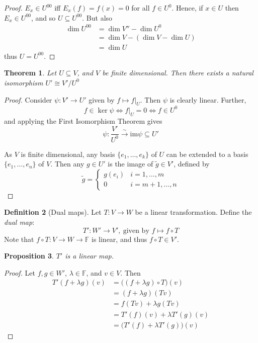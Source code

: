 \documentclass[10pt,fleqn]{article}
\newcommand{\im}{\mathrm{im}}
\newcommand{\field}{\mathbb{F}}
\theoremstyle{definition} \newtheorem{defn}{Definition}[section]
\theoremstyle{plain}      \newtheorem{thm}[defn]{Theorem}
\theoremstyle{plain}      \newtheorem{prop}[defn]{Proposition}
\theoremstyle{plain}      \newtheorem{lem}[defn]{Lemma}
\theoremstyle{plain}      \newtheorem{cor}[defn]{Corollary}
\theoremstyle{plain}      \newtheorem{ad}[defn]{Addendum}
\theoremstyle{definition} \newtheorem{ex}[defn]{Example}
\theoremstyle{definition} \newtheorem{rem}[defn]{Remark}
\numberwithin{equation}{subsection}
\begin{document}
\begin{proof}
    $E_x\in U^{00}$ iff $E_x(f)=f(x)=0$ for all $f\in U^0$.
    Hence, if $x\in U$ then $E_x\in U^{00}$, and so $U\subseteq U^{00}$.
    But also
    \begin{align*}
        \dim U^{00}
        &=
        \dim V''-\dim U^0\\
        &=
        \dim V-(\dim V-\dim U)\\
        &=
        \dim U
    \end{align*}
    thus $U=U^{00}$.
\end{proof}

\begin{thm}
    Let $U\subseteq V$, and $V$ be finite dimensional.
    Then there exists a natural isomorphism $U'\cong V'/U^0$
\end{thm}

\begin{proof}
    Consider $\psi:V'\to U'$ given by $f\mapsto f|_U$.
    Then $\psi$ is clearly linear.
    Further,
    \[
        f\in\ker\psi\iff
        f|_U=0\iff
        f\in U^0
    \]
    and applying the First Isomorphism Theorem gives
    \[
        \psi:\frac{V'}{U^0}\overset{\sim}{\to}\im\psi\subseteq U'
    \]

    As $V$ is finite dimensional, any basis $\{e_1,\ldots,e_k\}$ of $U$ can be extended to a basis $\{e_1,\ldots,e_n\}$ of $V$.
    Then any $g\in U'$ is the image of $\tilde{g}\in V'$, defined by
    \[
        \tilde{g}=
        \left\{
        \begin{array}{lr}
            g(e_i)&i=1,\ldots,m\\
            0&i=m+1,\ldots,n
        \end{array}
        \right.
    \]
\end{proof}

\begin{defn}[Dual maps]
    Let $T:V\to W$ be a linear transformation.
    Define the \emph{dual map}:
    \[
        T':W'\to V',~\text{given by }f\mapsto f\circ T
    \]
    Note that $f\circ T:V\to W\to\field$ is linear, and thus $f\circ T\in V'$.
\end{defn}

\begin{prop}
    $T'$ is a linear map.
\end{prop}

\begin{proof}
    Let $f,g\in W'$, $\lambda\in\field$, and $v\in V$.
    Then
    \begin{align*}
        T'(f+\lambda g)(v)
        &=
        \big((f+\lambda g)\circ T\big)(v)\\
        &=
        (f+\lambda g)(Tv)\\
        &=
        f(Tv)+\lambda g(Tv)\\
        &=
        T'(f)(v)+\lambda T'(g)(v)\\
        &=
        \big(T'(f)+\lambda T'(g)\big)(v)
    \end{align*}
\end{proof}
\end{document}
